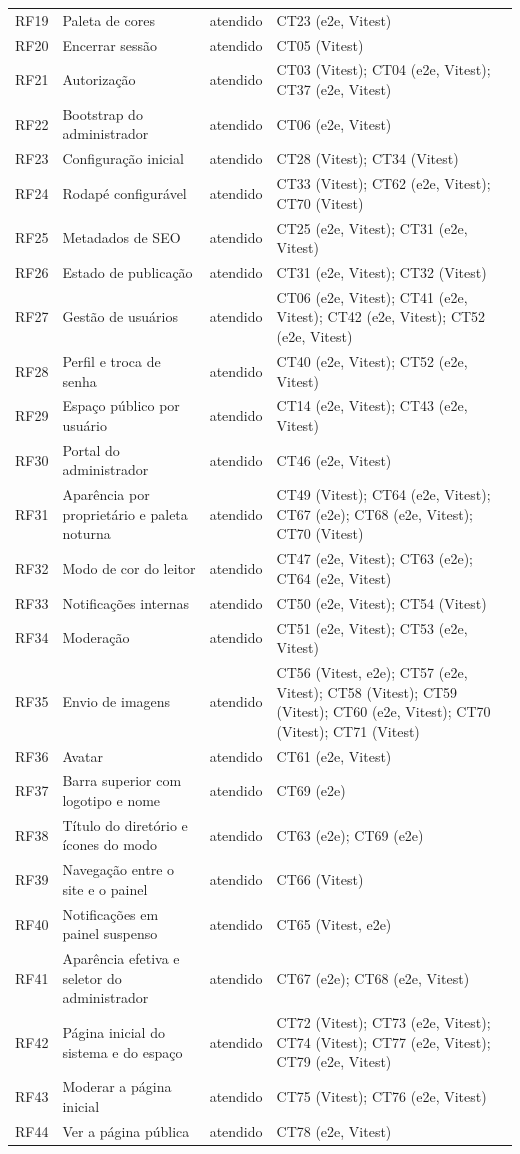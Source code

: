 \begin{longtable}{@{}L{1.4cm}L{4.4cm}L{2.4cm}L{5.4cm}@{}}
RF19 & Paleta de cores & atendido & CT23 (e2e, Vitest)\\
RF20 & Encerrar sessão & atendido & CT05 (Vitest)\\
RF21 & Autorização & atendido & CT03 (Vitest); CT04 (e2e, Vitest); CT37 (e2e, Vitest)\\
RF22 & Bootstrap do administrador & atendido & CT06 (e2e, Vitest)\\
RF23 & Configuração inicial & atendido & CT28 (Vitest); CT34 (Vitest)\\
RF24 & Rodapé configurável & atendido & CT33 (Vitest); CT62 (e2e, Vitest); CT70 (Vitest)\\
RF25 & Metadados de SEO & atendido & CT25 (e2e, Vitest); CT31 (e2e, Vitest)\\
RF26 & Estado de publicação & atendido & CT31 (e2e, Vitest); CT32 (Vitest)\\
RF27 & Gestão de usuários & atendido & CT06 (e2e, Vitest); CT41 (e2e, Vitest); CT42 (e2e, Vitest); CT52 (e2e, Vitest)\\
RF28 & Perfil e troca de senha & atendido & CT40 (e2e, Vitest); CT52 (e2e, Vitest)\\
RF29 & Espaço público por usuário & atendido & CT14 (e2e, Vitest); CT43 (e2e, Vitest)\\
RF30 & Portal do administrador & atendido & CT46 (e2e, Vitest)\\
RF31 & Aparência por proprietário e paleta noturna & atendido & CT49 (Vitest); CT64 (e2e, Vitest); CT67 (e2e); CT68 (e2e, Vitest); CT70 (Vitest)\\
RF32 & Modo de cor do leitor & atendido & CT47 (e2e, Vitest); CT63 (e2e); CT64 (e2e, Vitest)\\
RF33 & Notificações internas & atendido & CT50 (e2e, Vitest); CT54 (Vitest)\\
RF34 & Moderação & atendido & CT51 (e2e, Vitest); CT53 (e2e, Vitest)\\
RF35 & Envio de imagens & atendido & CT56 (Vitest, e2e); CT57 (e2e, Vitest); CT58 (Vitest); CT59 (Vitest); CT60 (e2e, Vitest); CT70 (Vitest); CT71 (Vitest)\\
RF36 & Avatar & atendido & CT61 (e2e, Vitest)\\
RF37 & Barra superior com logotipo e nome & atendido & CT69 (e2e)\\
RF38 & Título do diretório e ícones do modo & atendido & CT63 (e2e); CT69 (e2e)\\
RF39 & Navegação entre o site e o painel & atendido & CT66 (Vitest)\\
RF40 & Notificações em painel suspenso & atendido & CT65 (Vitest, e2e)\\
RF41 & Aparência efetiva e seletor do administrador & atendido & CT67 (e2e); CT68 (e2e, Vitest)\\
RF42 & Página inicial do sistema e do espaço & atendido & CT72 (Vitest); CT73 (e2e, Vitest); CT74 (Vitest); CT77 (e2e, Vitest); CT79 (e2e, Vitest)\\
RF43 & Moderar a página inicial & atendido & CT75 (Vitest); CT76 (e2e, Vitest)\\
RF44 & Ver a página pública & atendido & CT78 (e2e, Vitest)\\
\end{longtable}
